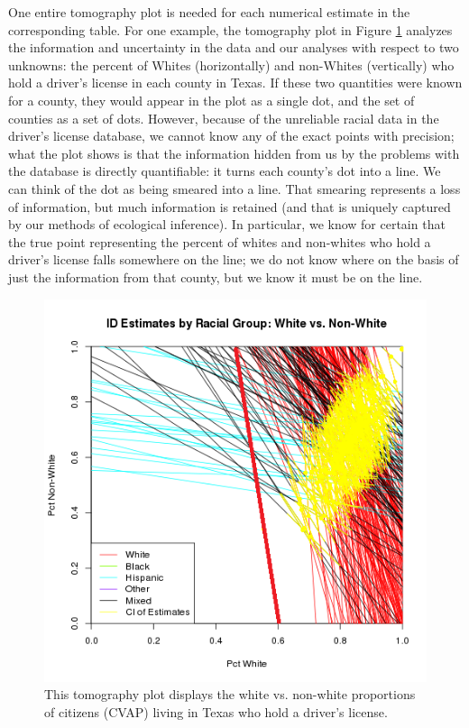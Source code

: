 \documentclass[12pt]{article}
\begin{document}
One entire tomography plot is needed for each numerical estimate in
the corresponding table. For one example, the tomography plot in
Figure \ref{tomog} analyzes the information and uncertainty in the
data and our analyses with respect to two unknowns: the percent of
Whites (horizontally) and non-Whites (vertically) who hold a driver's license in each county in Texas.
If these two
quantities were known for a county, they would appear in the plot as
a single dot, and the set of counties as a set of dots.  However,
because of the unreliable racial data in the driver's license database, we cannot know any of the exact points
with precision; what the plot shows is that the information hidden
from us by the problems with the database is directly quantifiable: it turns each
county's dot into a line.  We can think of the dot as being smeared
into a line. That smearing represents a loss of information, but much
information is retained (and that is uniquely captured by our methods
of ecological inference).  In particular, we know for certain that the
true point representing the percent of whites and non-whites who hold a driver's license
falls somewhere on the line; we do not know
where on the basis of just the information from that county, but we
know it must be on the line.

\begin{figure}[htb]
\begin{centering}
\includegraphics[scale=1]{figs/CVAP_f3_dl_white.png}
\caption{\label{tomog}This tomography plot displays the white vs. non-white proportions of citizens (CVAP)
living in Texas who hold a driver's license.}
\end{centering}
\end{figure}
\end{document}
